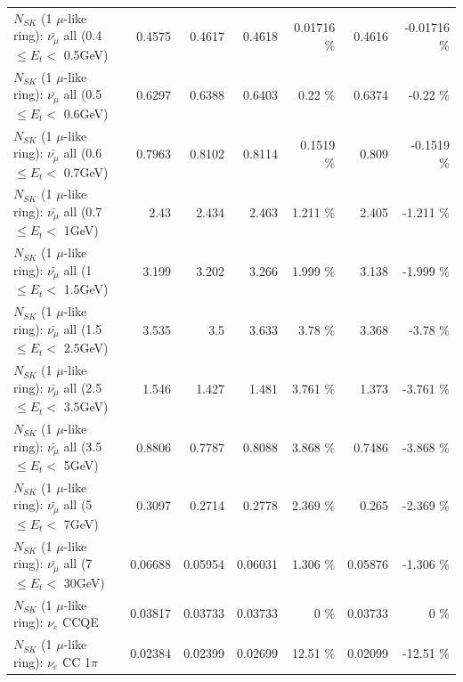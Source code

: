 \begin{table}
\begin{tabular}{| l | r | r | r  r | r  r |}
 $N_{SK}$ (1 $\mu$-like ring): $\bar{\nu_{\mu}}$ all (0.4 $\leq E_{t} <$ 0.5GeV) &          0.4575 &          0.4617 &          0.4618 &  0.01716 \%  &          0.4616 & -0.01716 \%  \\ 
 $N_{SK}$ (1 $\mu$-like ring): $\bar{\nu_{\mu}}$ all (0.5 $\leq E_{t} <$ 0.6GeV) &          0.6297 &          0.6388 &          0.6403 &     0.22 \%  &          0.6374 &    -0.22 \%  \\ 
 $N_{SK}$ (1 $\mu$-like ring): $\bar{\nu_{\mu}}$ all (0.6 $\leq E_{t} <$ 0.7GeV) &          0.7963 &          0.8102 &          0.8114 &   0.1519 \%  &           0.809 &  -0.1519 \%  \\ 
   $N_{SK}$ (1 $\mu$-like ring): $\bar{\nu_{\mu}}$ all (0.7 $\leq E_{t} <$ 1GeV) &            2.43 &           2.434 &           2.463 &    1.211 \%  &           2.405 &   -1.211 \%  \\ 
   $N_{SK}$ (1 $\mu$-like ring): $\bar{\nu_{\mu}}$ all (1 $\leq E_{t} <$ 1.5GeV) &           3.199 &           3.202 &           3.266 &    1.999 \%  &           3.138 &   -1.999 \%  \\ 
 $N_{SK}$ (1 $\mu$-like ring): $\bar{\nu_{\mu}}$ all (1.5 $\leq E_{t} <$ 2.5GeV) &           3.535 &             3.5 &           3.633 &     3.78 \%  &           3.368 &    -3.78 \%  \\ 
 $N_{SK}$ (1 $\mu$-like ring): $\bar{\nu_{\mu}}$ all (2.5 $\leq E_{t} <$ 3.5GeV) &           1.546 &           1.427 &           1.481 &    3.761 \%  &           1.373 &   -3.761 \%  \\ 
   $N_{SK}$ (1 $\mu$-like ring): $\bar{\nu_{\mu}}$ all (3.5 $\leq E_{t} <$ 5GeV) &          0.8806 &          0.7787 &          0.8088 &    3.868 \%  &          0.7486 &   -3.868 \%  \\ 
     $N_{SK}$ (1 $\mu$-like ring): $\bar{\nu_{\mu}}$ all (5 $\leq E_{t} <$ 7GeV) &          0.3097 &          0.2714 &          0.2778 &    2.369 \%  &           0.265 &   -2.369 \%  \\ 
    $N_{SK}$ (1 $\mu$-like ring): $\bar{\nu_{\mu}}$ all (7 $\leq E_{t} <$ 30GeV) &         0.06688 &         0.05954 &         0.06031 &    1.306 \%  &         0.05876 &   -1.306 \%  \\ 
\hline
\hline
\hline
                                      $N_{SK}$ (1 $\mu$-like ring): $\nu_e$ CCQE &         0.03817 &         0.03733 &         0.03733 &        0 \%  &         0.03733 &        0 \%  \\ 
                                 $N_{SK}$ (1 $\mu$-like ring): $\nu_e$ CC 1$\pi$ &         0.02384 &         0.02399 &         0.02699 &    12.51 \%  &         0.02099 &   -12.51 \%  \\ 

\end{tabular}
\end{table}
